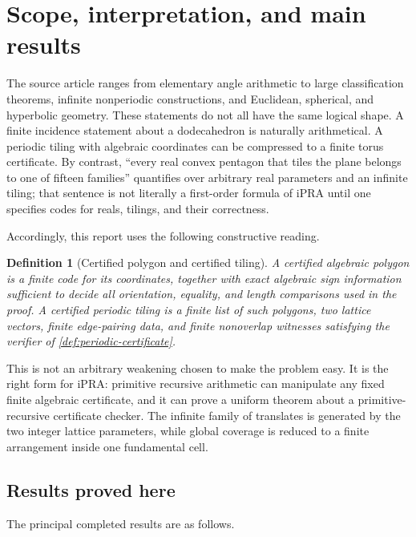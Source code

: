 \documentclass[11pt]{article}
\newtheorem{definition}[theorem]{Definition}
\theoremstyle{remark}
\newcommand{\ipra}{\mathrm{iPRA}}
\begin{document}
\tableofcontents
\newpage

\section{Scope, interpretation, and main results}

The source article ranges from elementary angle arithmetic to large
classification theorems, infinite nonperiodic constructions, and Euclidean,
spherical, and hyperbolic geometry.  These statements do not all have the same
logical shape.  A finite incidence statement about a dodecahedron is naturally
arithmetical.  A periodic tiling with algebraic coordinates can be compressed
to a finite torus certificate.  By contrast, ``every real convex pentagon that
tiles the plane belongs to one of fifteen families'' quantifies over arbitrary
real parameters and an infinite tiling; that sentence is not literally a
first-order formula of \(\ipra\) until one specifies codes for reals, tilings,
and their correctness.

Accordingly, this report uses the following constructive reading.

\begin{definition}[Certified polygon and certified tiling]
A \emph{certified algebraic polygon} is a finite code for its coordinates,
together with exact algebraic sign information sufficient to decide all
orientation, equality, and length comparisons used in the proof.  A
\emph{certified periodic tiling} is a finite list of such polygons, two lattice
vectors, finite edge-pairing data, and finite nonoverlap witnesses satisfying
the verifier of \cref{def:periodic-certificate}.
\end{definition}

This is not an arbitrary weakening chosen to make the problem easy.  It is the
right form for \(\ipra\): primitive recursive arithmetic can manipulate any
fixed finite algebraic certificate, and it can prove a uniform theorem about a
primitive-recursive certificate checker.  The infinite family of translates
is generated by the two integer lattice parameters, while global coverage is
reduced to a finite arrangement inside one fundamental cell.

\subsection{Results proved here}

The principal completed results are as follows.
\end{document}
